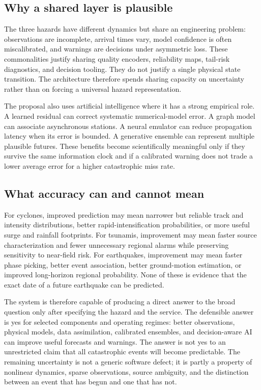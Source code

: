 \documentclass[conference]{IEEEtran}
\begin{document}
\subsection{Why a shared layer is plausible}

The three hazards have different dynamics but share an engineering problem: observations are incomplete, arrival times vary, model confidence is often miscalibrated, and warnings are decisions under asymmetric loss. These commonalities justify sharing quality encoders, reliability maps, tail-risk diagnostics, and decision tooling. They do not justify a single physical state transition. The architecture therefore spends sharing capacity on uncertainty rather than on forcing a universal hazard representation.

The proposal also uses artificial intelligence where it has a strong empirical role. A learned residual can correct systematic numerical-model error. A graph model can associate asynchronous stations. A neural emulator can reduce propagation latency when its error is bounded. A generative ensemble can represent multiple plausible futures. These benefits become scientifically meaningful only if they survive the same information clock and if a calibrated warning does not trade a lower average error for a higher catastrophic miss rate.

\subsection{What accuracy can and cannot mean}

For cyclones, improved prediction may mean narrower but reliable track and intensity distributions, better rapid-intensification probabilities, or more useful surge and rainfall footprints. For tsunamis, improvement may mean faster source characterization and fewer unnecessary regional alarms while preserving sensitivity to near-field risk. For earthquakes, improvement may mean faster phase picking, better event association, better ground-motion estimation, or improved long-horizon regional probability. None of these is evidence that the exact date of a future earthquake can be predicted.

The system is therefore capable of producing a direct answer to the broad question only after specifying the hazard and the service. The defensible answer is yes for selected components and operating regimes: better observations, physical models, data assimilation, calibrated ensembles, and decision-aware AI can improve useful forecasts and warnings. The answer is not yes to an unrestricted claim that all catastrophic events will become predictable. The remaining uncertainty is not a generic software defect; it is partly a property of nonlinear dynamics, sparse observations, source ambiguity, and the distinction between an event that has begun and one that has not.
\end{document}
